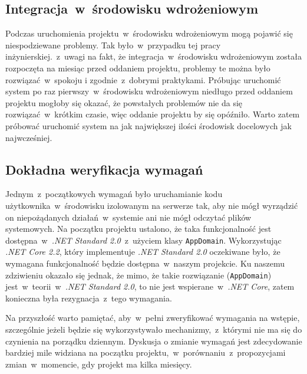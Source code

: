\documentclass[a4paper,11pt,twoside]{report}
\theoremstyle{definition}
\begin{document}
        \subsection{Integracja~w~środowisku wdrożeniowym}
            Podczas uruchomienia projektu~w~środowisku wdrożeniowym mogą pojawić się niespodziewane problemy. Tak było~w~przypadku tej pracy inżynierskiej.~z~uwagi na fakt, że integracja~w~środowisku wdrożeniowym została rozpoczęta na miesiąc przed oddaniem projektu, problemy te można było rozwiązać~w~spokoju i zgodnie~z~dobrymi praktykami.
            Próbując uruchomić system po raz pierwszy~w~środowisku wdrożeniowym niedługo przed oddaniem projektu mogłoby się okazać, że powstałych problemów nie da się rozwiązać~w~krótkim czasie, więc oddanie projektu by się opóźniło.
            Warto zatem próbować uruchomić system na jak największej ilości środowisk docelowych jak najwcześniej.
            
        \subsection{Dokładna weryfikacja wymagań}
            Jednym~z~początkowych wymagań było uruchamianie kodu użytkownika~w~środowisku izolowanym na serwerze tak, aby nie mógł wyrządzić on niepożądanych działań~w~systemie ani nie mógł odczytać plików systemowych.
            Na początku projektu ustalono, że taka funkcjonalność jest dostępna~w~{\textit{.NET Standard 2.0}}~z~użyciem klasy {\texttt{AppDomain}}. Wykorzystując {\textit{.NET Core 2.2}}, który implementuje {\textit{.NET Standard 2.0}} oczekiwane było, że wymagana funkcjonalność będzie dostępna~w~naszym projekcie.
            Ku naszemu zdziwieniu okazało się jednak, że mimo, że takie rozwiązanie ({\texttt{AppDomain}}) jest~w~teorii~w~{\textit{.NET Standard 2.0}}, to nie jest wspierane~w~{\textit{.NET Core}}, zatem konieczna była rezygnacja~z~tego wymagania.
            
            Na przyszłość warto pamiętać, aby~w~pełni zweryfikować wymagania na wstępie, szczególnie jeżeli będzie się wykorzystywało mechanizmy,~z~którymi nie ma się do czynienia na porządku dziennym. Dyskusja o zmianie wymagań jest zdecydowanie bardziej mile widziana na początku projektu,~w~porównaniu~z~propozycjami zmian~w~momencie, gdy projekt ma kilka miesięcy.
        
\end{document}
